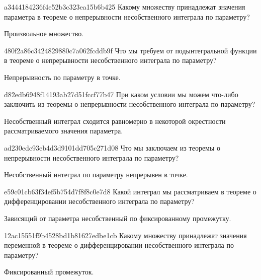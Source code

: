 \begin{note}{a3444184236f4e52b3c323ea15b6b425}
    Какому множеству принадлежат значения параметра в теореме о непрерывности несобственного интеграла по параметру?

    \begin{cloze}{1}
        Произвольное множество.
    \end{cloze}
\end{note}

\begin{note}{480f2a86c3424829880c7a062fcddb9f}
    Что мы требуем от подынтегральной функции в теореме о непрерывности несобственного интеграла по параметру?

    \begin{cloze}{1}
        Непрерывность по параметру в точке.
    \end{cloze}
\end{note}

\begin{note}{d82edb6948f14193ab27d51fccf77b47}
    При каком условии мы можем что-либо заключить из теоремы о непрерывности несобственного интеграла по параметру?

    \begin{cloze}{1}
        Несобственный интеграл сходится равномерно в некоторой окрестности рассматриваемого значения параметра.
    \end{cloze}
\end{note}

\begin{note}{ad230edc93eb4d3d9101dd705c271d08}
    Что мы заключаем из теоремы о непрерывности несобственного интеграла по параметру?

    \begin{cloze}{1}
        Несобственный интеграл по параметру непрерывен в точке.
    \end{cloze}
\end{note}

\begin{note}{e59c01cb63f34ef5b754d7f8f8c0e7d8}
    Какой интеграл мы рассматриваем в теореме о дифференцировании несобственного интеграла по параметру?

    \begin{cloze}{1}
        Зависящий от параметра несобственный по фиксированному промежутку.
    \end{cloze}
\end{note}

\begin{note}{12ac15551f9b4528bd1b81627edbe1cb}
    Какому множеству принадлежат значения переменной в теореме о дифференцировании несобственного интеграла по параметру?

    \begin{cloze}{1}
        Фиксированный промежуток.
    \end{cloze}
\end{note}

